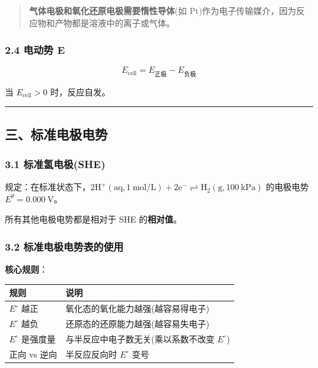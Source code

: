 \begin{quote}
\textbf{气体电极和氧化还原电极需要惰性导体}(如 Pt)作为电子传输媒介，因为反应物和产物都是溶液中的离子或气体。
\end{quote}

\subsubsection{2.4 电动势 E}\label{ux7535ux52a8ux52bf-e}

\[
E_{\text{cell}} = E_{\text{正极}} - E_{\text{负极}}
\]

当 \(E_{\text{cell}} > 0\) 时，反应自发。

\begin{center}\rule{0.5\linewidth}{0.5pt}\end{center}

\subsection{三、标准电极电势}\label{ux4e09ux6807ux51c6ux7535ux6781ux7535ux52bf}

\subsubsection{3.1 标准氢电极(SHE)}\label{ux6807ux51c6ux6c22ux7535ux6781she}

规定：在标准状态下，\(2\mathrm{H^+(aq, 1\ mol/L) + 2e^- \rightleftharpoons H_2(g, 100\ kPa)}\) 的电极电势 \(E^\theta = 0.000\ \mathrm{V}\)。

所有其他电极电势都是相对于 SHE 的\textbf{相对值}。

\subsubsection{3.2 标准电极电势表的使用}\label{ux6807ux51c6ux7535ux6781ux7535ux52bfux8868ux7684ux4f7fux7528}

\textbf{核心规则}：

{\def\LTcaptype{none} %
\begin{longtable}[]{@{}
  >{\raggedright\arraybackslash}p{}
  >{\raggedright\arraybackslash}p{}@{}}
\toprule\noalign{}
\begin{minipage}[b]{\linewidth}\raggedright
规则
\end{minipage} & \begin{minipage}[b]{\linewidth}\raggedright
说明
\end{minipage} \\
\midrule\noalign{}
\endhead
\bottomrule\noalign{}
\endlastfoot
\(E^{\circ}\) 越正 & 氧化态的氧化能力越强(越容易得电子) \\
\(E^{\circ}\) 越负 & 还原态的还原能力越强(越容易失电子) \\
\(E^{\circ}\) 是强度量 & 与半反应中电子数无关(乘以系数不改变 \(E^{\circ}\)) \\
正向 vs 逆向 & 半反应反向时 \(E^{\circ}\) 变号 \\
\end{longtable}
}

